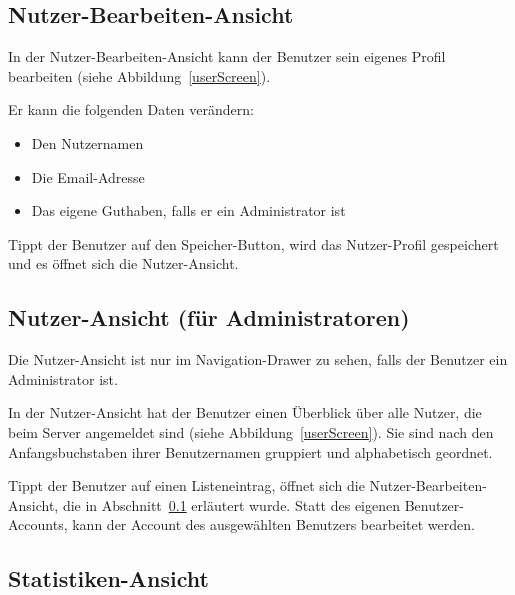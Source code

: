 
\subsection{Nutzer-Bearbeiten-Ansicht} \label{subsec:edit-user-screen}

In der Nutzer-Bearbeiten-Ansicht kann der Benutzer sein eigenes Profil bearbeiten (siehe Abbildung~\ref{userScreen}).


Er kann die folgenden Daten verändern:

\begin{itemize}
	\item Den Nutzernamen
	\item Die Email-Adresse
	\item Das eigene Guthaben, falls er ein Administrator ist
\end{itemize}

Tippt der Benutzer auf den Speicher-Button, wird das Nutzer-Profil gespeichert und es öffnet sich die Nutzer-Ansicht.

\subsection{Nutzer-Ansicht (für Administratoren)} \label{subsec:user-screen}

Die Nutzer-Ansicht ist nur im Navigation-Drawer zu sehen, falls der Benutzer ein Administrator ist.

In der Nutzer-Ansicht hat der Benutzer einen Überblick über alle Nutzer, die beim Server angemeldet sind (siehe Abbildung~\ref{userScreen}).
Sie sind nach den Anfangsbuchstaben ihrer Benutzernamen gruppiert und alphabetisch geordnet.

Tippt der Benutzer auf einen Listeneintrag, öffnet sich die Nutzer-Bearbeiten-Ansicht, die in Abschnitt~\ref{subsec:edit-user-screen} erläutert wurde.
Statt des eigenen Benutzer-Accounts, kann der Account des ausgewählten Benutzers bearbeitet werden.

\subsection{Statistiken-Ansicht} \label{subsec:statistics-screen}

